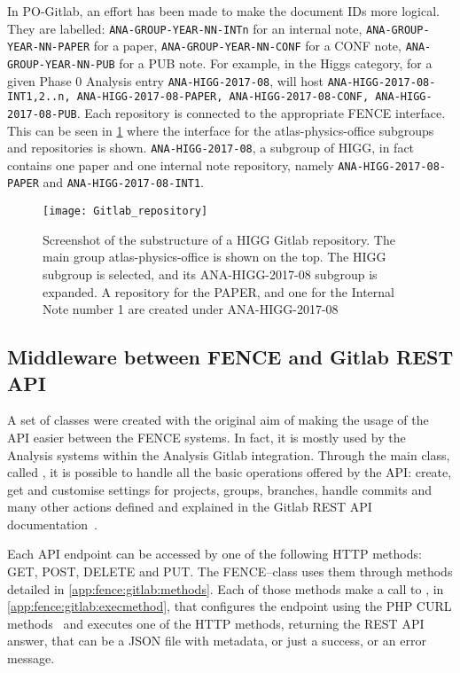 In PO-Gitlab, an effort has been made to make the document IDs  more logical.
They are labelled: \texttt{ANA-GROUP-YEAR-NN-INTn} for an internal note,
\texttt{ANA-GROUP-YEAR-NN-PAPER} for a paper,
\texttt{ANA-GROUP-YEAR-NN-CONF} for a CONF note,
\texttt{ANA-GROUP-YEAR-NN-PUB} for a PUB note.
For example, in the Higgs category, for a given Phase 0 Analysis entry \texttt{ANA-HIGG-2017-08},
\pogitlab will host \texttt{ANA-HIGG-2017-08-INT1,2..n, ANA-HIGG-2017-08-PAPER, ANA-HIGG-2017-08-CONF, ANA-HIGG-2017-08-PUB}.
Each repository is connected to the appropriate FENCE interface.
This can be seen in \cref{fig:Gitlab_repository} where the \gitlab interface for the atlas-physics-office subgroups and repositories is shown.
\texttt{ANA-HIGG-2017-08}, a subgroup of HIGG, in fact contains one paper and one internal note repository, namely \texttt{ANA-HIGG-2017-08-PAPER} and \texttt{ANA-HIGG-2017-08-INT1}.

\begin{figure}[htb]
  \centering
  \texttt{[image: Gitlab\_repository]}
  \caption{Screenshot of the substructure of a HIGG Gitlab repository. The main group atlas-physics-office is shown on the top. The HIGG subgroup is selected, and its ANA-HIGG-2017-08 subgroup is expanded. A repository for the PAPER, and one for the Internal Note number 1 are created under ANA-HIGG-2017-08}%
  \label{fig:Gitlab_repository}
\end{figure}

\subsection{Middleware between FENCE and Gitlab REST API}%
\label{sec:Middleware_between_FENCE_and_Gitlab_REST_API}

A set of classes were created with the original aim of making the usage of the \gitlab API easier between the FENCE systems.
In fact, it is mostly used by the Analysis systems within the Analysis Gitlab integration.
Through the main class, called , it is possible to handle all the basic operations offered by the API\@: create, get and customise settings for projects, groups, branches, handle commits and many other actions defined and explained in the Gitlab REST API documentation~\cite{rest_api}.

Each API endpoint can be accessed by one of the following HTTP methods: GET, POST, DELETE and PUT\@.
The FENCE--\gitlab class uses them through methods detailed in \cref{app:fence:gitlab:methods}.
Each of those methods make a call to , in \cref{app:fence:gitlab:execmethod},
that configures the endpoint using the PHP CURL methods~\cite{php_curl} and executes one of the HTTP methods, returning the REST API answer, that can be a JSON file with metadata, or just a success, or an error message.

